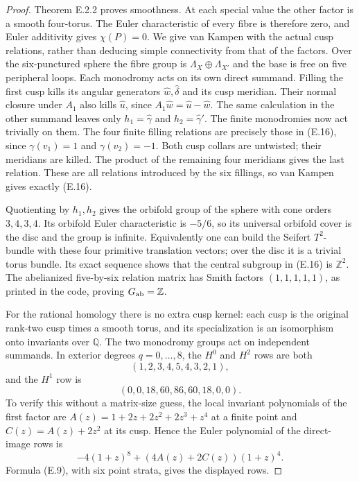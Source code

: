 \begin{proof}
Theorem E.2.2 proves smoothness.  At each special value the other
factor is a smooth four-torus.  The Euler characteristic of every
fibre is therefore zero, and Euler additivity gives $\chi(P)=0$.
We give van Kampen with the actual cusp relations, rather than
deducing simple connectivity from that of the factors.
Over the six-punctured sphere the fibre group is
$\Lambda_X\oplus\Lambda_{X'}$ and the base is free on five
peripheral loops.  Each monodromy acts on its own direct summand.
Filling the first cusp kills its angular generators
$\widehat w,\widehat\delta$ and its cusp meridian.  Their normal
closure under $A_1$ also kills $\widehat u$, since
$A_1\widehat w=\widehat u-\widehat w$.  The same calculation
in the other summand leaves only $h_1=\widehat\gamma$ and
$h_2=\widehat\gamma'$.  The finite monodromies now act trivially
on them.  The four finite filling relations are precisely those
in (E.16), since $\gamma(v_1)=1$ and $\gamma(v_2)=-1$.
Both cusp collars are untwisted; their meridians are killed.
The product of the remaining four meridians gives the last
relation.  These are all relations introduced by the six
fillings, so van Kampen gives exactly (E.16).

Quotienting by $h_1,h_2$ gives the orbifold group of the sphere
with cone orders $3,4,3,4$.  Its orbifold Euler characteristic
is $-5/6$, so its universal orbifold cover is the disc and the
group is infinite.  Equivalently one can build the Seifert
$T^2$-bundle with these four primitive translation vectors; over
the disc it is a trivial torus bundle.  Its exact sequence shows
that the central subgroup in (E.16) is $\mathbb Z^2$.
The abelianized five-by-six relation matrix has Smith factors
$(1,1,1,1,1)$, as printed in the code, proving $G_{\rm ab}=\mathbb Z$.

For the rational homology there is no extra cusp kernel: each
cusp is the original rank-two cusp times a smooth torus, and its
specialization is an isomorphism onto invariants over $\mathbb Q$.
The two monodromy groups act on independent summands.  In exterior
degrees $q=0,\ldots,8$, the $H^0$ and $H^2$ rows are both
\[
 (1,2,3,4,5,4,3,2,1),
\]
and the $H^1$ row is
\[
 (0,0,18,60,86,60,18,0,0).
\]
To verify this without a matrix-size guess, the local invariant
polynomials of the first factor are
$A(z)=1+2z+2z^2+2z^3+z^4$ at a finite point and
$C(z)=A(z)+2z^2$ at its cusp.  Hence the Euler polynomial of
the direct-image rows is
\[
 -4(1+z)^8+(4A(z)+2C(z))(1+z)^4.
\]
Formula (E.9), with six point strata, gives the displayed rows.


\end{proof}
